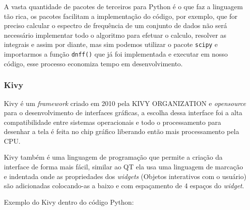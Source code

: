             A vasta quantidade de pacotes de terceiros para Python é o que faz a linguagem tão rica, os 
            pacotes facilitam a implementação do código, por exemplo, que for preciso calcular o espectro de 
            frequência de um conjunto de dados não será necessário implementar todo o algoritmo para efetuar o calculo, resolver as integrais e assim por diante, mas sim podemos utilizar o pacote \verb|scipy| e importarmos a função \verb|dnff()| que já foi implementada e executar em nosso código, esse processo economiza tempo em desenvolvimento.           
            
            \subsubsection{Kivy}
            
            
            \label{lim_kivy}
            Kivy é um \textit{framework} criado em 2010 pela KIVY ORGANIZATION \cite{kivy} e \textit{opensource} para o desenvolvimento de interfaces gráficas, a escolha dessa interface foi a alta compatibilidade entre sistemas operacionais e todo o processamento para desenhar a tela é feita no chip gráfico liberando então mais processamento pela CPU.
            
            Kivy também é uma linguagem de programação que permite a criação da interface de forma mais fácil, similar ao QT  ela usa uma linguagem de marcação e indentada onde as propriedades dos \textit{widgets} (Objetos interativos com o usuário) são adicionadas colocando-as a baixo e com espaçamento de 4 espaços do \textit{widget}. 
                        
            Exemplo do Kivy dentro do código Python:
            \begin{quote}
                                                                                 
            \end{quote}
            
